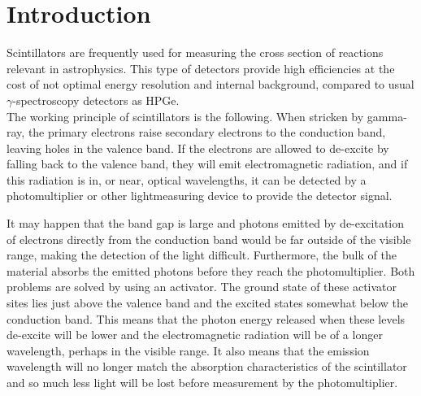 \section{Introduction}
\label{sec:introduction}

Scintillators are frequently used for measuring the cross section of reactions relevant in astrophysics. This type of detectors provide high efficiencies at the cost of not optimal energy resolution and internal background, compared to usual $\gamma$-spectroscopy detectors as HPGe.  \\

The working principle of scintillators is the following. When stricken by gamma-ray, the primary electrons raise secondary electrons to the conduction band, leaving holes in the valence band. 
If the electrons are allowed to de-excite by falling back to the valence band, they will emit electromagnetic radiation, and if this radiation is in, or near, optical wavelengths, it can be detected by a photomultiplier or other lightmeasuring
device to provide the detector signal.

It may happen that the band gap is large and photons emitted by de-excitation of electrons directly from the conduction band would be far outside of the
visible range, making the detection of the light difficult. Furthermore, the bulk of the material absorbs the emitted photons before they reach the photomultiplier. Both problems are solved by using an activator. The ground state of these activator sites lies just above the valence band and the excited states somewhat below the conduction band. This means that the photon energy released when these levels de-excite will be lower and the electromagnetic radiation will be of a longer wavelength, perhaps in the visible range. It also means that the emission wavelength will no longer match the absorption characteristics of the scintillator and so much less light will be lost before measurement by the
photomultiplier. \\


